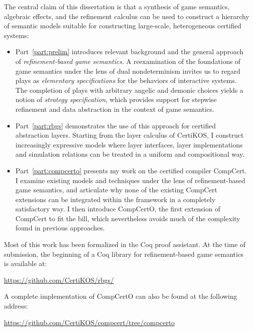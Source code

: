 \documentclass[11pt,oneside,draft]{book}
\theoremstyle{definition}
\begin{document}
The central claim of this dissertation is that a synthesis
of %
game semantics, algebraic effects, and the refinement calculus
can be used to construct a hierarchy of semantic models
suitable for constructing large-scale, heterogeneous certified systems:
\begin{itemize}
  \item
    Part~\ref{part:prelim} introduces relevant background
    and the general approach of
    \emph{refinement-based game semantics}.
    A reexamination of the foundations of game semantics
    under the lens of dual nondeterminism
    invites us to regard plays as \emph{elementary specifications}
    for the behaviors of interactive systems.
    The completion of plays
    with arbitrary angelic and demonic choices
    yields a notion of \emph{strategy specification},
    which provides support for
    stepwise refinement and data abstraction
    in the context of game semantics.
  \item
    Part~\ref{part:rbgs} demonstrates the use of this approach
    for certified abstraction layers.
    Starting from the layer calculus of CertiKOS,
    I construct increasingly expressive models
    where layer interfaces, layer implementations and
    simulation relations
    can be treated in a uniform and compositional way.
  \item
    Part~\ref{part:compcerto}
    presents my work on the certified compiler CompCert.
    I examine existing models and techniques
    under the lens of refinement-based game semantics,
    and articulate why none of the existing
    CompCert extensions can be integrated within
    the framework in a completely satisfactory way.
    I then introduce CompCertO,
    the first extension of CompCert to fit the bill,
    which nevertheless avoids much of the complexity
    found in previous approaches.
\end{itemize}

Most of this work has been formalized in the Coq proof assistant.
At the time of submission,
the beginning of a Coq library
for refinement-based game semantics
is available at:
\begin{center}
  \url{https://github.com/CertiKOS/rbgs/}
\end{center}
A complete implementation of CompCertO
can also be found at the following address:
\begin{center}
  \url{https://github.com/CertiKOS/compcert/tree/compcerto}
\end{center}
\end{document}
